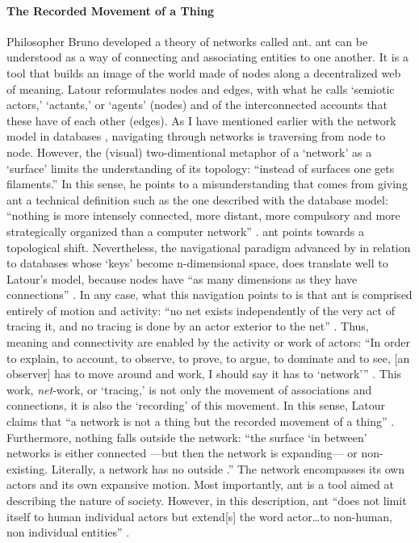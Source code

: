 \paragraph{The Recorded Movement of a Thing}
Philosopher Bruno \textcite{Lat90:On, Lat93:We} developed a theory of networks called \gls{ant}. \gls{ant} can be understood as a way of connecting and associating entities to one another. It is a tool that builds an image of the world made of nodes along a decentralized web of meaning. Latour reformulates nodes and edges, with what he calls `semiotic actors,' `actants,' or `agents' (nodes) and of the interconnected accounts that these have of each other (edges). As I have mentioned earlier with the network model in databases , navigating through networks is traversing from node to node. However, the (visual) two-dimentional metaphor of a `network' as a `surface' limits the understanding of its topology: ``instead of surfaces one gets filaments.'' \parencite[3]{Lat90:On} In this sense, he points to a misunderstanding that comes from giving \gls{ant} a technical definition such as the one described with the database model: ``nothing is more intensely connected, more distant, more compulsory and more strategically organized than a computer network'' \parencite[2]{Lat90:On}. \gls{ant} points towards a topological shift. Nevertheless, the navigational paradigm advanced by \textcite{Bachman:1973:PN:355611.362534} in relation to databases whose `keys' become n-dimensional space, does translate well to Latour's model, because nodes have ``as many dimensions as they have connections'' \parencite[3]{Lat90:On}. In any case, what this navigation points to is that \gls{ant} is comprised entirely of motion and activity: ``no net exists independently of the very act of tracing it, and no tracing is done by an actor exterior to the net'' \parencite[14]{Lat90:On}. Thus, meaning and connectivity are enabled by the activity or work of actors: ``In order to explain, to account, to observe, to prove, to argue, to dominate and to see, [an observer] has to move around and work, I should say it has to `network''' \parencite[13]{Lat90:On}. This work, \textit{net}-work, or `tracing,' is not only the movement of associations and connections, it is also the `recording' of this movement. In this sense, Latour claims that ``a network is not a thing but the recorded movement of a thing'' \parencite[14]{Lat90:On}. Furthermore, nothing falls outside the network: ``the surface `in between' networks is either connected ---but then the network is expanding--- or non-existing. Literally, a network has no outside \parencite[6]{Lat90:On}.'' The network encompasses its own actors and its own expansive motion. Most importantly, \gls{ant} is a tool aimed at describing the nature of society. However, in this description, \gls{ant} ``does not limit itself to human individual actors but extend[s] the word actor\dots to non-human, non individual entities'' \parencite[2]{Lat90:On}.

